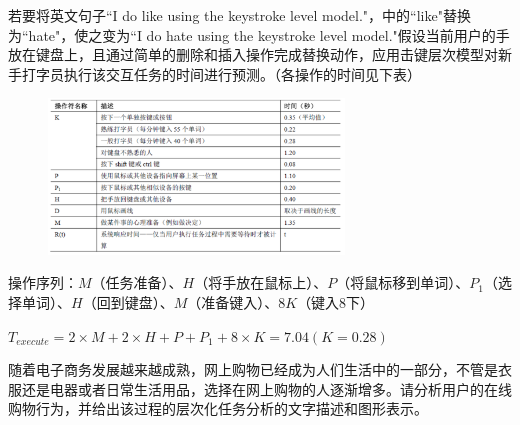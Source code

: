 \begin{problem}
若要将英文句子``I do like using the keystroke level model."，中的``like"替换为``hate"，使之变为``I do hate using the keystroke level model."假设当前用户的手放在键盘上，且通过简单的删除和插入操作完成替换动作，应用击键层次模型对新手打字员执行该交互任务的时间进行预测。（各操作的时间见下表）
\begin{figure}[H]
    \vspace{-0.5em}
	\centering
	\includegraphics[width=0.7\textwidth]{2.png}
    \vspace{-1em}
\end{figure}
\end{problem}

\begin{solution}
操作序列：$M$（任务准备）、$H$（将手放在鼠标上）、$P$（将鼠标移到单词）、$P_1$（选择单词）、$H$（回到键盘）、$M$（准备键入）、$8K$（键入8下）

$T_{execute} =2\times M+ 2\times H + P +P_1 + 8\times K=7.04 (K=0.28)$
\end{solution}



\begin{problem}
随着电子商务发展越来越成熟，网上购物已经成为人们生活中的一部分，不管是衣服还是电器或者日常生活用品，选择在网上购物的人逐渐增多。请分析用户的在线购物行为，并给出该过程的层次化任务分析的文字描述和图形表示。
\end{problem}

